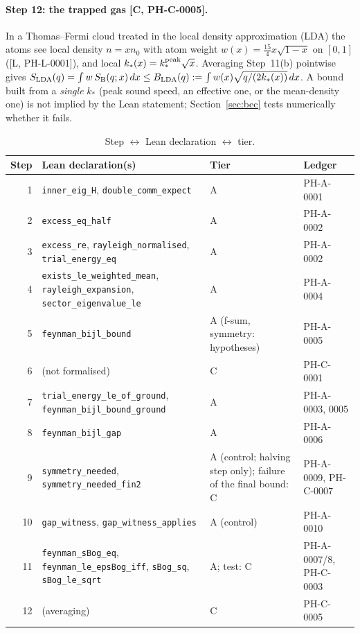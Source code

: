 \documentclass[11pt]{article}
\theoremstyle{remark}
\newcommand{\tier}[1]{\textsf{[#1]}}
\newcommand{\lean}[1]{\texttt{#1}}
\newcommand{\ks}{k_*}
\newcommand{\SB}{S_{\mathrm B}}
\begin{document}
\paragraph{Step 12: the trapped gas \tier{C, PH-C-0005}.} In a Thomas--Fermi cloud treated in the local density approximation (LDA) the
atoms see local density $n=xn_0$ with atom weight $w(x)=\tfrac{15}{4}x\sqrt{1-x}$ on $[0,1]$ (\tier{L, PH-L-0001}), and local $\ks(x)=\ks^{\rm peak}\sqrt x$.
Averaging Step~11(b) pointwise gives
$S_{\rm LDA}(q)=\int w\,\SB(q;x)\,dx\le B_{\rm LDA}(q):=\int w(x)\sqrt{q/(2\ks(x))}\,dx$. A bound built from a \emph{single} $\ks$ (peak sound speed, an effective one, or the mean-density one) is
not implied by the Lean statement; Section~\ref{sec:bec} tests numerically whether it fails.

\begin{table}[t]\centering\small
\caption{Step $\leftrightarrow$ Lean declaration $\leftrightarrow$ tier.}\label{tab:steps}
\begin{tabular}{rp{7.4cm}p{3.3cm}p{2.9cm}}\toprule
Step & Lean declaration(s) & Tier & Ledger\\\midrule
1 & \lean{inner\_eig\_H}, \lean{double\_comm\_expect} & A & PH-A-0001\\
2 & \lean{excess\_eq\_half} & A & PH-A-0002\\
3 & \lean{excess\_re}, \lean{rayleigh\_normalised}, \lean{trial\_energy\_eq} & A & PH-A-0002\\
4 & \lean{exists\_le\_weighted\_mean}, \lean{rayleigh\_expansion}, \lean{sector\_eigenvalue\_le} & A & PH-A-0004\\
5 & \lean{feynman\_bijl\_bound} & A (f-sum, symmetry: hypotheses) & PH-A-0005\\
6 & (not formalised) & C & PH-C-0001\\
7 & \lean{trial\_energy\_le\_of\_ground}, \lean{feynman\_bijl\_bound\_ground} & A & PH-A-0003, 0005\\
8 & \lean{feynman\_bijl\_gap} & A & PH-A-0006\\
9 & \lean{symmetry\_needed}, \lean{symmetry\_needed\_fin2} & A (control; halving step only); failure of the final bound: C & PH-A-0009, PH-C-0007\\
10 & \lean{gap\_witness}, \lean{gap\_witness\_applies} & A (control) & PH-A-0010\\
11 & \lean{feynman\_sBog\_eq}, \lean{feynman\_le\_epsBog\_iff}, \lean{sBog\_sq}, \lean{sBog\_le\_sqrt} & A; test: C & PH-A-0007/8, PH-C-0003\\
12 & (averaging) & C & PH-C-0005\\\bottomrule
\end{tabular}
\end{table}
\end{document}
